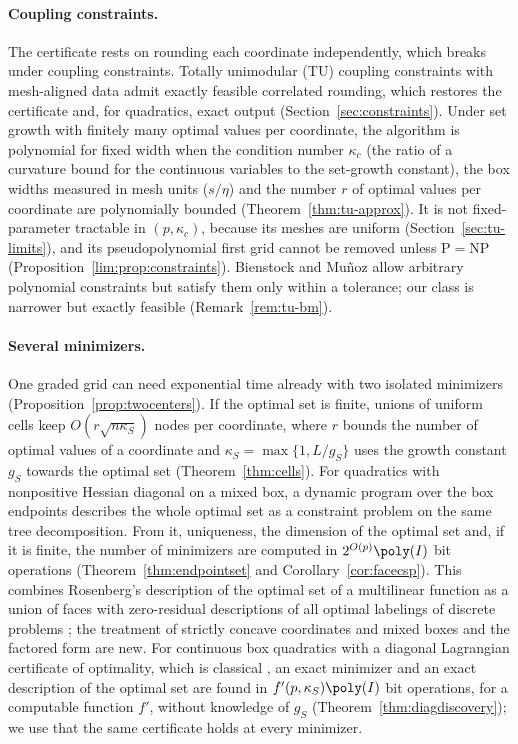 \paragraph{Coupling constraints.}
The certificate rests on rounding each coordinate independently, which
breaks under coupling constraints. Totally unimodular (TU) coupling
constraints with mesh-aligned data admit exactly feasible correlated
rounding, which restores the certificate and, for quadratics, exact output
(Section~\ref{sec:constraints}). Under set growth with finitely many optimal
values per coordinate, the algorithm is polynomial for fixed width when the
condition number $\kappa_c$ (the ratio of a curvature bound for the
continuous variables to the set-growth constant), the box widths measured in
mesh units ($s/\eta$) and the number $r$ of optimal values per coordinate are
polynomially bounded (Theorem~\ref{thm:tu-approx}). It is not
fixed-parameter tractable in $(p,\kappa_c)$, because its meshes are uniform
(Section~\ref{sec:tu-limits}), and its pseudopolynomial first grid cannot be
removed unless P${}={}$NP (Proposition~\ref{lim:prop:constraints}). Bienstock
and Mu\~noz \cite{BienstockMunoz2018} allow arbitrary polynomial constraints
but satisfy them only within a tolerance; our class is narrower but exactly
feasible (Remark~\ref{rem:tu-bm}).
\paragraph{Several minimizers.}
One graded grid can need exponential time already with two isolated
minimizers (Proposition~\ref{prop:twocenters}). If the optimal set is finite,
unions of uniform cells keep $O(r\sqrt{n\kappa_S})$ nodes per coordinate,
where $r$ bounds the number of optimal values of a coordinate and
$\kappa_S=\max\{1,L/g_S\}$ uses the growth constant $g_S$ towards the optimal
set (Theorem~\ref{thm:cells}). For quadratics with nonpositive Hessian diagonal
on a mixed box, a dynamic program over the box endpoints describes the whole
optimal set as a constraint problem on the same tree decomposition. From it,
uniqueness, the dimension of the optimal set and, if it is finite, the number
of minimizers are computed in $2^{O(p)}\poly(I)$ bit operations
(Theorem~\ref{thm:endpointset} and Corollary~\ref{cor:facecsp}). This
combines Rosenberg's description of the optimal set of a multilinear function
as a union of faces \cite{Rosenberg1972} with zero-residual descriptions of
all optimal labelings of discrete problems
\cite{WainwrightJaakkolaWillsky2005,Werner2007}; the treatment of strictly
concave coordinates and mixed boxes and the factored form are new. For continuous box quadratics with a diagonal
Lagrangian certificate of optimality, which is classical
\cite{JeyakumarRubinovWu2006,LiWuQuan2015}, an exact minimizer and an exact
description of the optimal set are found in $f'(p,\kappa_S)\poly(I)$ bit
operations, for a computable function $f'$, without knowledge of $g_S$
(Theorem~\ref{thm:diagdiscovery}); we use that the same certificate holds at
every minimizer.

